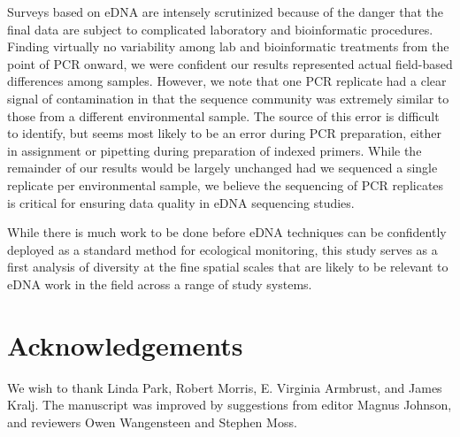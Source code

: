 \documentclass[11pt,letterpaper]{article} %
\begin{document}
Surveys based on eDNA are intensely scrutinized because of the danger that the final data are subject to complicated laboratory and bioinformatic procedures. Finding virtually no variability among lab and bioinformatic treatments from the point of PCR onward, we were confident our results represented actual field-based differences among samples. However, we note that one PCR replicate had a clear signal of contamination in that the sequence community was extremely similar to those from a different environmental sample. The source of this error is difficult to identify, but seems most likely to be an error during PCR preparation, either in assignment or pipetting during preparation of indexed primers. While the remainder of our results would be largely unchanged had we sequenced a single replicate per environmental sample, we believe the sequencing of PCR replicates is critical for ensuring data quality in eDNA sequencing studies.


While there is much work to be done before eDNA techniques can be confidently deployed as a standard method for ecological monitoring, this study serves as a first analysis of diversity at the fine spatial scales that are likely to be relevant to eDNA work in the field across a range of study systems.

\section*{Acknowledgements}
We wish to thank Linda Park, Robert Morris, E. Virginia Armbrust, and James Kralj.
The manuscript was improved by suggestions from editor Magnus Johnson, and reviewers Owen Wangensteen and Stephen Moss.

%
\end{document}
